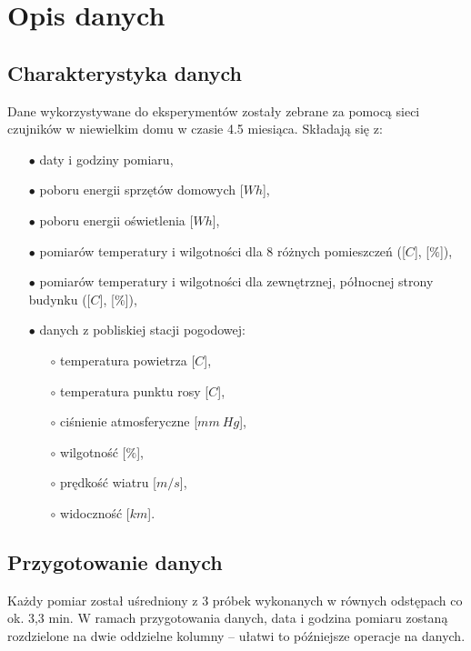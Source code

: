 \documentclass[a4paper,11pt,twoside]{mwrep}  %
\begin{document}
\begingroup
\let\clearpage\relax
\chapter{Opis danych}

\section{Charakterystyka danych}

Dane wykorzystywane do eksperymentów zostały zebrane za pomocą sieci czujników w niewielkim domu w czasie 4.5 miesiąca. 
Składają się z:
\begin{itemize}
\item[$\bullet$] daty i godziny pomiaru,
\item[$\bullet$] poboru energii sprzętów domowych [$Wh$],
\item[$\bullet$] poboru energii oświetlenia [$Wh$],
\item[$\bullet$] pomiarów temperatury i wilgotności dla 8 różnych pomieszczeń ([\degree $C$], [$\%$]),
\item[$\bullet$] pomiarów temperatury i wilgotności dla zewnętrznej, północnej strony budynku ([\degree $C$], [$\%$]),
\item[$\bullet$] danych z pobliskiej stacji pogodowej:
	\begin{itemize}
	\item[$\circ$] temperatura powietrza [\degree $C$],
	\item[$\circ$] temperatura punktu rosy [\degree $C$],
	\item[$\circ$] ciśnienie atmosferyczne [$mm~Hg$],
	\item[$\circ$] wilgotność [$\%$],
	\item[$\circ$] prędkość wiatru [$m/s$],
	\item[$\circ$] widoczność [$km$].
	\end{itemize}
\end{itemize}

\section{Przygotowanie danych}
Każdy pomiar został uśredniony z 3 próbek wykonanych w równych odstępach co ok. 3,3 min. W ramach przygotowania danych, data i godzina pomiaru zostaną rozdzielone na dwie oddzielne kolumny -- ułatwi to późniejsze operacje na danych.
\endgroup


\clearpage
\end{document}
